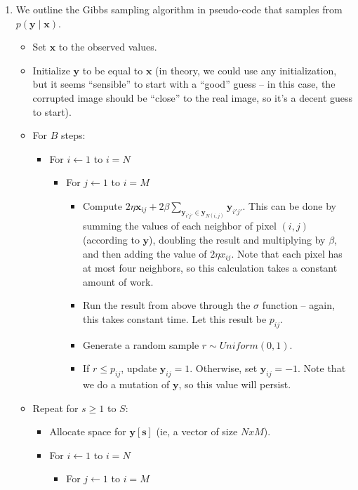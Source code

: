 \documentclass[12pt]{article}
\newcommand{\vect}[1]{\boldsymbol{#1}}
\begin{document}
\begin{enumerate}[label=(\alph*)]
\item We outline the Gibbs sampling algorithm in pseudo-code that samples from $p(\vect{y} \mid \vect{x})$.
	\begin{itemize}
		\item Set $\vect{x}$ to the observed values. 
		\item Initialize $\vect{y}$ to be equal to $\vect{x}$ (in theory, we could use any initialization, but it seems ``sensible'' to start with a ``good'' guess -- in this case, the corrupted image should be ``close'' to the real image, so it's a decent guess to start).
		\item For $B$ steps:
			\begin{itemize}
				\item For $i \gets 1$ to $i = N$
				 	\begin{itemize}
				 		\item For $j \gets 1$ to $i = M$
				 			\begin{itemize}
				 				\item Compute $2\eta \vect{x}_{ij} + 2\beta\sum_{\vect{y}_{i'j'} \in \vect{y}_{N(i,j)}} \vect{y}_{i'j'}$. This can be done by summing the values of each neighbor of pixel $(i,j)$ (according to $\vect{y}$), doubling the result and multiplying by $\beta$, and then adding the value of $2\eta x_{ij}$. Note that each pixel has at most four neighbors, so this calculation takes a constant amount of work.
				 				\item Run the result from above through the $\sigma$ function -- again, this takes constant time. Let this result be $p_{ij}$.
				 				\item Generate a random sample $r \sim Uniform(0,1)$.
				 				\item If $r \leq p_{ij}$, update $\vect{y}_{ij} = 1$. Otherwise, set $\vect{y}_{ij} = -1$. Note that we do a mutation of $\vect{y}$, so this value will persist.
				 			\end{itemize}
				 	\end{itemize}
			\end{itemize}
		\item Repeat for $s \geq 1$ to $S$:
			\begin{itemize}
				\item Allocate space for $\vect{y[s]}$ (ie, a vector of size $NxM$).
				\item For $i \gets 1$ to $i = N$
				 	\begin{itemize}
				 		\item For $j \gets 1$ to $i = M$
				 			\begin{itemize}

\end{itemize}
\end{itemize}
\end{itemize}
\end{itemize}
\end{enumerate}
\end{document}
